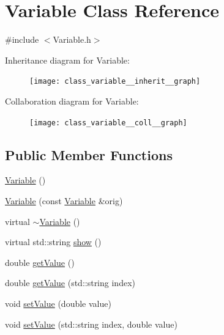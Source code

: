\hypertarget{class_variable}{\section{Variable Class Reference}
\label{class_variable}
}


{\ttfamily \#include $<$Variable.\-h$>$}



Inheritance diagram for Variable\-:\nopagebreak
\begin{figure}[H]
\begin{center}
\leavevmode
\texttt{[image: class\_variable\_\_inherit\_\_graph]}
\end{center}
\end{figure}


Collaboration diagram for Variable\-:\nopagebreak
\begin{figure}[H]
\begin{center}
\leavevmode
\texttt{[image: class\_variable\_\_coll\_\_graph]}
\end{center}
\end{figure}
\subsection*{Public Member Functions}
\begin{DoxyCompactItemize}
\item 
\hyperlink{class_variable_a5716c9dcafcc8cf59a6f6b5dac3ec7a2}{Variable} ()
\item 
\hyperlink{class_variable_a1974dd984e1ee5bf74f25d03301108c1}{Variable} (const \hyperlink{class_variable}{Variable} \&orig)
\item 
virtual \hyperlink{class_variable_acfc14d0ad77af53025f890b4d3a7745a}{$\sim$\-Variable} ()
\item 
virtual std\-::string \hyperlink{class_variable_a8bd0a772bb32fd630e252306306cd154}{show} ()
\item 
double \hyperlink{class_variable_a010d43b1092dbc6c3a1c2e0e3e4fc611}{get\-Value} ()
\item 
double \hyperlink{class_variable_a7f127c40dfbac529972ce03daf42a944}{get\-Value} (std\-::string index)
\item 
void \hyperlink{class_variable_a04078db9b38af4589e50ff4c6f468086}{set\-Value} (double value)
\item 
void \hyperlink{class_variable_a8403bc8f6c01702e1f3d6e0031731bca}{set\-Value} (std\-::string index, double value)
\end{DoxyCompactItemize}
